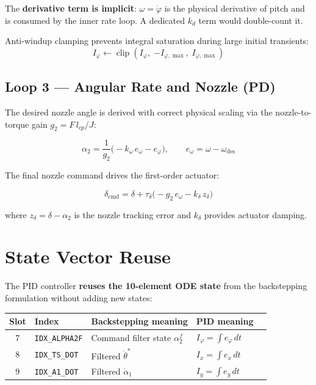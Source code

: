 \documentclass[11pt,a4paper]{article}
\newcommand{\clip}{\operatorname{clip}}
\begin{document}
The \textbf{derivative term is implicit}: $\omega = \dot\varphi$ is the physical derivative of pitch and is consumed by the inner rate loop. A dedicated $k_d$ term would double-count it.

Anti-windup clamping prevents integral saturation during large initial transients:
\[
  I_\varphi \leftarrow \clip(I_\varphi,\;{-I_{\varphi,\max}},\;I_{\varphi,\max})
\]

\subsection{Loop 3 --- Angular Rate and Nozzle (PD)}

The desired nozzle angle is derived with correct physical scaling via the nozzle-to-torque gain $g_2 = F\,l_{cp}/J$:

\begin{equation}
  \alpha_{2} = \frac{1}{g_2}\bigl(-k_\omega\,e_\omega - e_\varphi\bigr), \qquad e_\omega = \omega - \omega_{\mathrm{des}}
\end{equation}

The final nozzle command drives the first-order actuator:

\begin{equation}
  \delta_{\mathrm{cmd}} = \delta + \tau_\delta\bigl(-g_2\,e_\omega - k_\delta\,z_\delta\bigr)
\end{equation}

where $z_\delta = \delta - \alpha_2$ is the nozzle tracking error and $k_\delta$ provides actuator damping.

\section{State Vector Reuse}

The PID controller \textbf{reuses the 10-element ODE state} from the backstepping formulation without adding new states:

\begin{center}
\begin{tabular}{cllll}
\toprule
Slot & Index & Backstepping meaning & PID meaning \\
\midrule
7 & \texttt{IDX\_ALPHA2F} & Command filter state $\alpha_2^f$ & $I_\varphi = \int e_\varphi\,dt$ \\
8 & \texttt{IDX\_TS\_DOT}  & Filtered $\dot\theta^*$           & $I_x = \int e_x\,dt$ \\
9 & \texttt{IDX\_A1\_DOT}  & Filtered $\dot\alpha_1$           & $I_y = \int e_y\,dt$ \\
\bottomrule
\end{tabular}
\end{center}
\end{document}
